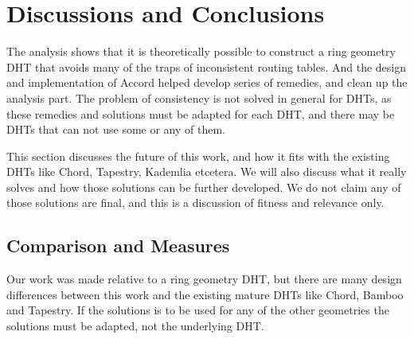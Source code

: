 \section{Discussions and Conclusions}
\label{sec:Conclution}
\label{sec:Discussion}


The analysis shows that it is theoretically possible to construct a ring geometry
 DHT that avoids many of the traps of inconsistent routing tables. And the design
 and implementation of Accord helped develop series of remedies, and clean up
 the analysis part. The problem of consistency is not solved
 in general for DHTs, as these remedies
 and solutions must be adapted for each DHT, and there may be DHTs that can not
 use some or any of them.

This section discusses the future of this work, and how it fits with the existing
 DHTs like Chord, Tapestry, Kademlia etcetera. We will also discuss what it really
 solves and how those solutions can be further developed. We do not claim any of
 those solutions are final, and this is a discussion of fitness and relevance only.

\subsection{Comparison and Measures}

Our work was made relative to a ring geometry DHT, but there are many design
 differences between this work and the existing mature DHTs like Chord, Bamboo
 and Tapestry. If the solutions is to be used for any of the other geometries
 the solutions must be adapted, not the underlying DHT.

